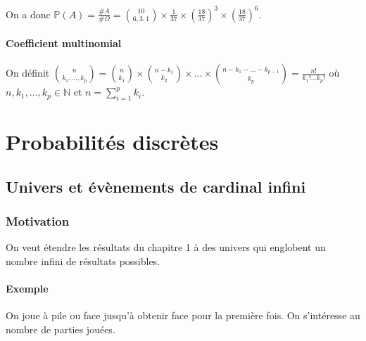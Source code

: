 \documentclass[a4paper,10pt]{book} %
\newcommand{\N}{\mathbb{N}}
\renewcommand{\P}{\mathbb{P}} %
\begin{document}
\hspace*{1.95cm}

On a donc $\P(A)=\frac{\# A}{\# \Omega}=\binom{10}{6,3,1}\times \frac{1}{37}\times \left(\frac{18}{37}\right)^3\times \left(\frac{18}{37}\right)^6$.

\subsubsection{Coefficient multinomial}
On définit $\binom{n}{k_1,...,k_p}=\binom{n}{k_1}\times \binom{n-k_1}{k_2}\times ...\times \binom{n-k_1-...-k_{p-1}}{k_p}=\frac{n!}{k_1!...k_p!}$ où $n,k_1,...,k_p\in \N$ et $\displaystyle n=\sum_{i=1}^p k_i$.\\

\chapter{Probabilités discrètes}
\section{Univers et évènements de cardinal infini}
\subsection*{Motivation}
On veut étendre les résultats du chapitre 1 à des univers qui englobent un nombre infini de résultats possibles.

\subsubsection*{Exemple}
On joue à pile ou face jusqu'à obtenir face pour la première fois. On s'intéresse au nombre de parties jouées.
\end{document}
